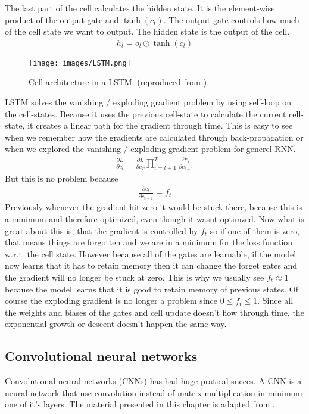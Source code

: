 \documentclass[a4paper,12pt]{article}
\begin{document}
The last part of the cell calculates the hidden state. It is the element-wise product of the output gate and $\tanh(c_t)$. The output gate controls how much of the cell state we want to output. The hidden state is the output of the cell.
\begin{align}
  h_t = o_t \odot \tanh(c_t)
\end{align}
\begin{figure}[H]
  \centering
  \texttt{[image: images/LSTM.png]}
  \caption{Cell architecture in a LSTM. (reproduced from \cite{goodfellow2016figure})} %
  \label{fig:n5}
\end{figure}
LSTM solves the vanishing / exploding gradient problem by using self-loop on the cell-states. Because it uses the previous cell-state to calculate the current cell-state, it creates a linear path for the gradient through time. This is easy to see when we remember how the gradients are calculated through back-propagation or when we explored the vanishing / exploding gradient problem for generel RNN.
\begin{align}
  \frac{\partial L}{\partial c_t} = \frac{\partial L}{\partial c_T} \prod_{i=t+1}^{T} \frac{\partial c_t}{\partial c_{t-1}}
\end{align}
But this is no problem because
\begin{align}
  \frac{\partial c_t}{\partial c_{t-1}} = f_t
\end{align}
Previously whenever the gradient hit zero it would be stuck there, because this is a minimum and therefore optimized, even though it wasnt optimzed. Now what is great about this is, that the gradient is controlled by $f_t$ so if one of them is zero, that means things are forgotten and we are in a minimum for the loss function w.r.t. the cell state. 
However because all of the gates are learnable, if the model now learns that it has to retain memory then it can change the forget gates and the gradient will no longer be stuck at zero. This is why we usually see $f_t \approx 1$ because the model learns that it is good to retain memory of previous states.
Of course the exploding gradient is no longer a problem since $0\leq f_t \leq 1$. Since all the weights and biases of the gates and cell update doesn't flow through time, the exponential growth or descent doesn't happen the same way.
\subsection{Convolutional neural networks}
Convolutional neural networks (CNNs) has had huge pratical succes. A CNN is a neural network that use convolution instead of matrix multiplication in minimum one of it's layers. The material presented in this chapter is adapted from \cite{goodfellow2016CNN}.
\end{document}
